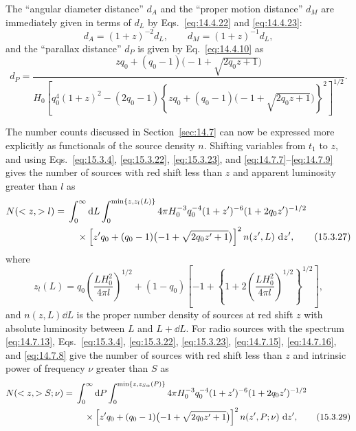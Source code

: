 The ``angular diameter distance'' \(d_A\) and the ``proper motion distance''
\(d_M\) are immediately given in terms of \(d_L\) by
Eqs.~\eqref{eq:14.4.22} and \eqref{eq:14.4.23}:
\[
  d_A=(1+z)^{-2}d_L,
  \qquad
  d_M=(1+z)^{-1}d_L,
\]
and the ``parallax distance'' \(d_P\) is given by Eq.~\eqref{eq:14.4.10}
as
\begin{equation}
  d_P
  =
  \frac{
    zq_0+(q_0-1)\bigl(-1+\sqrt{2q_0z+1}\bigr)
  }{
    H_0
    \left[
      q_0^4(1+z)^2
      -(2q_0-1)
      \left\{
        zq_0+(q_0-1)\bigl(-1+\sqrt{2q_0z+1}\bigr)
      \right\}^{\!2}
    \right]^{1/2}
  }.
  \tag{15.3.26}\label{eq:15.3.26}
\end{equation}

The number counts discussed in Section~\ref{sec:14.7} can now be expressed
more explicitly as functionals of the source density \(n\). Shifting variables
from \(t_1\) to \(z\), and using Eqs.~\eqref{eq:15.3.4},
\eqref{eq:15.3.22}, \eqref{eq:15.3.23}, and
\eqref{eq:14.7.7}--\eqref{eq:14.7.9} gives the number of sources with red
shift less than \(z\) and apparent luminosity greater than \(l\) as
\begin{align}
  N(<z,>l)
  ={}&
  \int_0^\infty\mathop{}\!\mathrm{d} L
  \int_0^{\min\{z,z_l(L)\}}
  4\pi H_0^{-3}q_0^{-4}
  (1+z')^{-6}(1+2q_0z')^{-1/2}
  \notag\\
  &\quad\times
  \left[
    z'q_0+(q_0-1)\bigl(-1+\sqrt{2q_0z'+1}\bigr)
  \right]^2
  n(z',L)\,\mathop{}\!\mathrm{d} z',
  \tag{15.3.27}\label{eq:15.3.27}
\end{align}
where
\begin{equation}
  z_l(L)
  =
  q_0\left(\frac{LH_0^2}{4\pi l}\right)^{1/2}
  +(1-q_0)
  \left[
    -1+
    \left\{
      1+2\left(\frac{LH_0^2}{4\pi l}\right)^{1/2}
    \right\}^{1/2}
  \right],
  \tag{15.3.28}\label{eq:15.3.28}
\end{equation}
and \(n(z,L)\dd L\) is the proper number density of sources at red shift
\(z\) with absolute luminosity between \(L\) and \(L+\dd L\). For radio
sources with the spectrum \eqref{eq:14.7.13},
Eqs.~\eqref{eq:15.3.4}, \eqref{eq:15.3.22}, \eqref{eq:15.3.23},
\eqref{eq:14.7.15}, \eqref{eq:14.7.16}, and \eqref{eq:14.7.8} give the
number of sources with red shift less than \(z\) and intrinsic power of
frequency \(\nu\) greater than \(S\) as
\begin{align}
  N(<z,>S;\nu)
  ={}&
  \int_0^\infty\mathop{}\!\mathrm{d} P
  \int_0^{\min\{z,z_{S\alpha}(P)\}}
  4\pi H_0^{-3}q_0^{-4}
  (1+z')^{-6}(1+2q_0z')^{-1/2}
  \notag\\
  &\quad\times
  \left[
    z'q_0+(q_0-1)\bigl(-1+\sqrt{2q_0z'+1}\bigr)
  \right]^2
  n(z',P;\nu)\,\mathop{}\!\mathrm{d} z',
  \tag{15.3.29}\label{eq:15.3.29}
\end{align}
